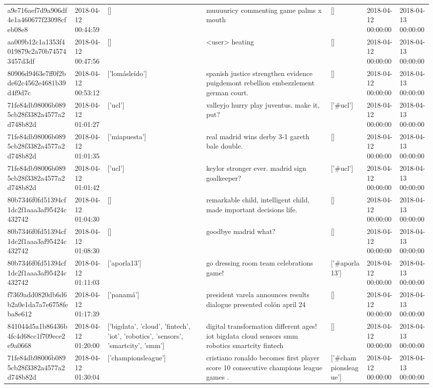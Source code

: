 \begin{tabular}{lllllll}
a9e716aef7d9a906df4e1a460677f23098cfeb08e8 & 2018-04-12 00:44:59 & [] & muuuuricy commenting game palms x mouth 👏🏻👏🏻👏🏻 & [] & 2018-04-12 00:00:00 & 2018-04-13 00:00:00 \\
aa009b12c1a1353f4019879c2a70b745743457d3df & 2018-04-12 00:47:56 & [] & <user> heating & [] & 2018-04-12 00:00:00 & 2018-04-13 00:00:00 \\
80906d9463e7ff0f2bde62c4562e4681b39d4f9d7c & 2018-04-12 00:53:12 & ['lomásleído'] & spanish justice strengthen evidence puigdemont rebellion embezzlement german court. & [] & 2018-04-12 00:00:00 & 2018-04-13 00:00:00 \\
71fe84db98006b0895cb28f3382a4577a2d748b82d & 2018-04-12 01:01:27 & ['ucl'] & valleyjo hurry play juventus. make it, put? & ['#ucl'] & 2018-04-12 00:00:00 & 2018-04-13 00:00:00 \\
71fe84db98006b0895cb28f3382a4577a2d748b82d & 2018-04-12 01:01:35 & ['miapuesta'] & real madrid wins derby 3-1 gareth bale double. & [] & 2018-04-12 00:00:00 & 2018-04-13 00:00:00 \\
71fe84db98006b0895cb28f3382a4577a2d748b82d & 2018-04-12 01:01:42 & ['ucl'] & keylor stronger ever. madrid sign goalkeeper? & ['#ucl'] & 2018-04-12 00:00:00 & 2018-04-13 00:00:00 \\
80b7346f0fd51394cf1dc2f1aaa3af95424c432742 & 2018-04-12 01:04:30 & [] & remarkable child, intelligent child, made important decisions life. & [] & 2018-04-12 00:00:00 & 2018-04-13 00:00:00 \\
80b7346f0fd51394cf1dc2f1aaa3af95424c432742 & 2018-04-12 01:08:30 & [] & goodbye madrid what? & [] & 2018-04-12 00:00:00 & 2018-04-13 00:00:00 \\
80b7346f0fd51394cf1dc2f1aaa3af95424c432742 & 2018-04-12 01:11:03 & ['aporla13'] & go dressing room team celebrations game! & ['#aporla13'] & 2018-04-12 00:00:00 & 2018-04-13 00:00:00 \\
f7369add0820db6d6b2a0e1da7a7e6758feba8e612 & 2018-04-12 01:17:39 & ['panamá'] & president varela announces results dialogue presented colón april 24 & [] & 2018-04-12 00:00:00 & 2018-04-13 00:00:00 \\
841044d5a1b86436b4fc4d68cc1f709ece2e9a0668 & 2018-04-12 01:20:00 & ['bigdata', 'cloud', 'fintech', 'iot', 'robotics', 'sensors', 'smartcity', 'smm'] & digital transformation different ages! iot bigdata cloud sensors smm robotics smartcity fintech & [] & 2018-04-12 00:00:00 & 2018-04-13 00:00:00 \\
71fe84db98006b0895cb28f3382a4577a2d748b82d & 2018-04-12 01:30:04 & ['championsleague'] & cristiano ronaldo becomes first player score 10 consecutive champions league games . & ['#championsleague'] & 2018-04-12 00:00:00 & 2018-04-13 00:00:00 \\

\end{tabular}
